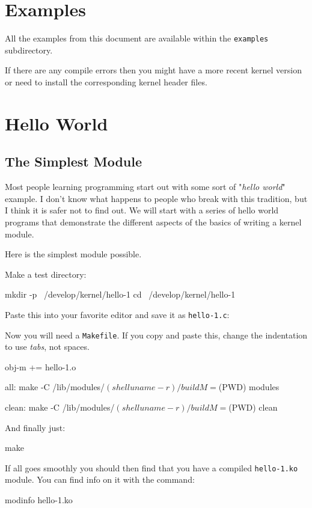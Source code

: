\documentclass[10pt, oneside]{book}
\begin{document}
\section{Examples}
\label{sec:examples}
All the examples from this document are available within the \verb|examples| subdirectory.

If there are any compile errors then you might have a more recent kernel version or need to install the corresponding kernel header files.

\section{Hello World}
\label{sec:helloworld}
\subsection{The Simplest Module}
\label{sec:org2d3e245}
Most people learning programming start out with some sort of "\emph{hello world}" example.
I don't know what happens to people who break with this tradition, but I think it is safer not to find out.
We will start with a series of hello world programs that demonstrate the different aspects of the basics of writing a kernel module.

Here is the simplest module possible.

Make a test directory:
\begin{codebash}
mkdir -p ~/develop/kernel/hello-1
cd ~/develop/kernel/hello-1
\end{codebash}

Paste this into your favorite editor and save it as \verb|hello-1.c|:


Now you will need a \verb|Makefile|. If you copy and paste this, change the indentation to use \textit{tabs}, not spaces.

\begin{code}
obj-m += hello-1.o

all:
	make -C /lib/modules/$(shell uname -r)/build M=$(PWD) modules

clean:
	make -C /lib/modules/$(shell uname -r)/build M=$(PWD) clean
\end{code}

And finally just:
\begin{codebash}
make
\end{codebash}

If all goes smoothly you should then find that you have a compiled \verb|hello-1.ko| module.
You can find info on it with the command:
\begin{codebash}
modinfo hello-1.ko
\end{codebash}
\end{document}
